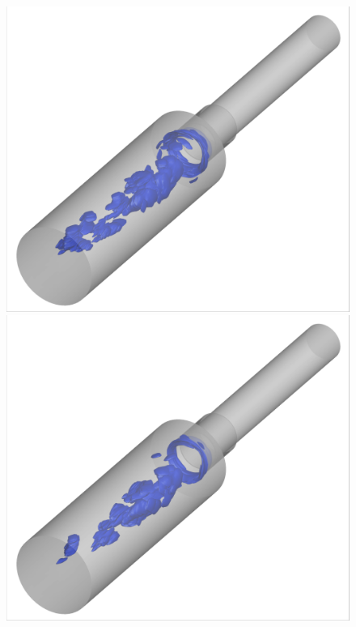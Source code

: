 \begin{figure}
	\centering
	\begin{minipage}{0.45\linewidth}
		\includegraphics[width=0.99\linewidth,trim={0.5em 0.5em 0.5em 0.5em},clip]{Chapters/AdaptiveResults/Images/cvrc/iblank/iblank_iso_1025.png}
	\end{minipage}
	\begin{minipage}{0.45\linewidth}
		\includegraphics[width=0.99\linewidth,trim={0.5em 0.5em 0.5em 0.5em},clip]{Chapters/AdaptiveResults/Images/cvrc/iblank/iblank_iso_1050.png}
	\end{minipage}


\end{figure}
